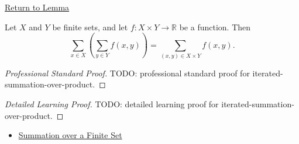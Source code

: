 \newpage
{}
\label{prf:iterated-summation-over-product}

\begin{remark*}[Return]
\hyperref[lem:iterated-summation-over-product]{Return to Lemma}
\end{remark*}

\begin{lemma*}
Let \(X\) and \(Y\) be finite sets, and let
\(f:X\times Y\to\mathbb{R}\) be a function. Then
\[
  \sum_{x\in X}
  \left(
    \sum_{y\in Y} f(x,y)
  \right)
  =
  \sum_{(x,y)\in X\times Y} f(x,y).
\]
\end{lemma*}

\begin{proof}[Professional Standard Proof]
\LRAProofBodyStart
TODO: professional standard proof for iterated-summation-over-product.
\end{proof}

\begin{proof}[Detailed Learning Proof]
\LRAProofBodyStart
TODO: detailed learning proof for iterated-summation-over-product.
\end{proof}

\begin{remark*}
\end{remark*}

\begin{dependencies}
\begin{itemize}
  \item \hyperref[def:summation-over-finite-set]{Summation over a Finite Set}
\end{itemize}
\end{dependencies}

\clearpage

